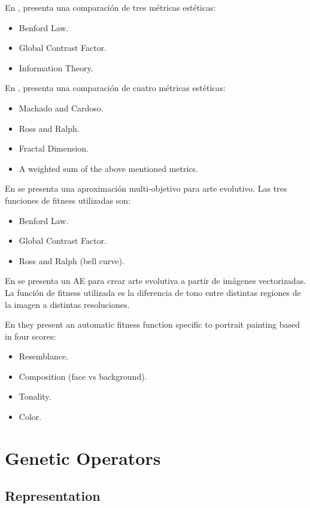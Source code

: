 \documentclass[conference]{IEEEtran}
\begin{document}
En \cite{den2010using}, presenta una comparación de tres métricas estéticas:
\begin{itemize}
	\item Benford Law.
	\item Global Contrast Factor.
	\item Information Theory.
\end{itemize}

En \cite{den2010comparing}, presenta una comparación de cuatro métricas estéticas:
\begin{itemize}
	\item Machado and Cardoso.
	\item Ross and Ralph.
	\item Fractal Dimension.
	\item A weighted sum of the above mentioned metrics.
\end{itemize}

En \cite{den2011evolving} se presenta una aproximación multi-objetivo para arte evolutivo. Las tres funciones de fitness utilizadas son:
\begin{itemize}
	\item Benford Law.
	\item Global Contrast Factor.
	\item Ross and Ralph (bell curve).
\end{itemize}

En \cite{den2012evolving} se presenta un AE para crear arte evolutiva a partir de imágenes vectorizadas. La función de fitness utilizada es la diferencia de tono entre  distintas regiones de la imagen a distintas resoluciones.

En \cite{dipaola2009incorporating} they present an automatic fitness function specific to portrait painting based in four scores:
\begin{itemize}
	\item Resemblance.
	\item Composition (face vs background).
	\item Tonality.
	\item Color.
\end{itemize}


\section{Genetic Operators}\label{go}
\subsection{Representation}\label{go:repre}
\end{document}
